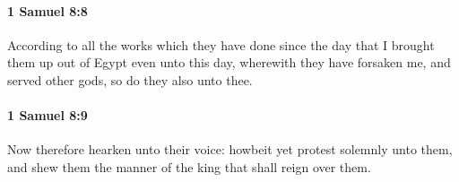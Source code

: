 		\paragraph{1 Samuel 8:8} %
			\label{1SAMUEL-8-8}

			According to all the works which they have done since the day that I brought them up out of Egypt even unto this day, wherewith they have forsaken me, and served other gods, so do they also unto thee.


		\paragraph{1 Samuel 8:9} %
			\label{1SAMUEL-8-9}

			Now therefore hearken unto their voice: howbeit yet protest solemnly unto them, and shew them the manner of the king that shall reign over them.



